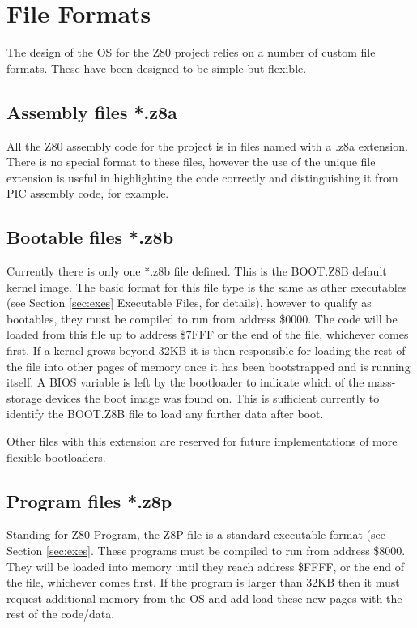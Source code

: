 \chapter{File Formats}
The design of the OS for the Z80 project relies on a number of custom file
formats.  These have been designed to be simple but flexible.

\section{Assembly files *.z8a}
All the Z80 assembly code for the project is in files named with a .z8a
extension.  There is no special format to these files, however the use of the
unique file extension is useful in highlighting the code correctly and
distinguishing it from PIC assembly code, for example.

\section{Bootable files *.z8b}
Currently there is only one *.z8b file defined.  This is the BOOT.Z8B default
kernel image.  The basic format for this file type is the same as other
executables (see Section \ref{sec:exes} Executable Files, for details), however 
to qualify as bootables, they must be compiled to run from address \$0000.  The
code will be loaded from this file up to address \$7FFF or the end of the file,
whichever comes first.  If a kernel grows beyond 32KB it is then responsible for
loading the rest of the file into other pages of memory once it has been
bootstrapped and is running itself.  A BIOS variable is left by the bootloader
to indicate which of the mass-storage devices the boot image was found on.  This
is sufficient currently to identify the BOOT.Z8B file to load any further data
after boot.

Other files with this extension are reserved for future implementations of more
flexible bootloaders.

\section{Program files *.z8p}
Standing for Z80 Program, the Z8P file is a standard executable format (see
Section \ref{sec:exes}.  These programs must be compiled to run from address
\$8000.  They will be loaded into memory until they reach address \$FFFF, or the
end of the file, whichever comes first.  If the program is larger than 32KB then
it must request additional memory from the OS and add load these new pages with
the rest of the code/data.

